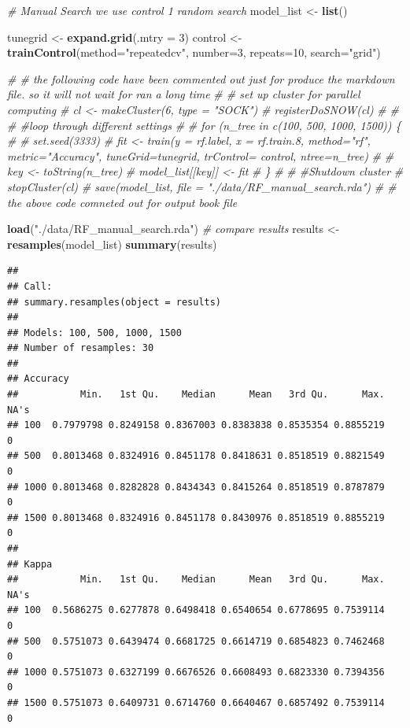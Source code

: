 \documentclass[
]{book}
\newenvironment{Shaded}{\begin{snugshade}}{\end{snugshade}}
\newcommand{\CommentTok}[1]{\textcolor[rgb]{0.56,0.35,0.01}{\textit{#1}}}
\newcommand{\DataTypeTok}[1]{\textcolor[rgb]{0.13,0.29,0.53}{#1}}
\newcommand{\DecValTok}[1]{\textcolor[rgb]{0.00,0.00,0.81}{#1}}
\newcommand{\KeywordTok}[1]{\textcolor[rgb]{0.13,0.29,0.53}{\textbf{#1}}}
\newcommand{\NormalTok}[1]{#1}
\newcommand{\StringTok}[1]{\textcolor[rgb]{0.31,0.60,0.02}{#1}}
\begin{document}
\begin{Shaded}
\begin{Highlighting}[]
\CommentTok{# Manual Search we use control 1 random search}
\NormalTok{model_list <-}\StringTok{ }\KeywordTok{list}\NormalTok{()}

\NormalTok{tunegrid <-}\StringTok{ }\KeywordTok{expand.grid}\NormalTok{(}\DataTypeTok{.mtry =} \DecValTok{3}\NormalTok{)}
\NormalTok{control <-}\StringTok{ }\KeywordTok{trainControl}\NormalTok{(}\DataTypeTok{method=}\StringTok{"repeatedcv"}\NormalTok{, }\DataTypeTok{number=}\DecValTok{3}\NormalTok{, }\DataTypeTok{repeats=}\DecValTok{10}\NormalTok{, }\DataTypeTok{search=}\StringTok{"grid"}\NormalTok{)}

\CommentTok{# # the following code have been commented out just for produce the markdown file. so it will not wait for ran a long time}
\CommentTok{# # set up cluster for parallel computing}
\CommentTok{# cl <- makeCluster(6, type = "SOCK")}
\CommentTok{# registerDoSNOW(cl)}
\CommentTok{# }
\CommentTok{# }
\CommentTok{# #loop through different settings}
\CommentTok{# }
\CommentTok{# for (n_tree in c(100, 500, 1000, 1500)) \{}
\CommentTok{#   }
\CommentTok{#   set.seed(3333)}
\CommentTok{#   fit <- train(y = rf.label, x = rf.train.8,  method="rf", metric="Accuracy",  tuneGrid=tunegrid, trControl= control, ntree=n_tree)}
\CommentTok{# }
\CommentTok{#   key <- toString(n_tree)}
\CommentTok{#   model_list[[key]] <- fit}
\CommentTok{# \}}
\CommentTok{# }
\CommentTok{# #Shutdown cluster}
\CommentTok{# stopCluster(cl)}
\CommentTok{# save(model_list, file = "./data/RF_manual_search.rda")}
\CommentTok{# # the above code comneted out for output book file}

\KeywordTok{load}\NormalTok{(}\StringTok{"./data/RF_manual_search.rda"}\NormalTok{)}
\CommentTok{# compare results}
\NormalTok{results <-}\StringTok{ }\KeywordTok{resamples}\NormalTok{(model_list)}
\KeywordTok{summary}\NormalTok{(results)}
\end{Highlighting}
\end{Shaded}

\begin{verbatim}
## 
## Call:
## summary.resamples(object = results)
## 
## Models: 100, 500, 1000, 1500 
## Number of resamples: 30 
## 
## Accuracy 
##           Min.   1st Qu.    Median      Mean   3rd Qu.      Max. NA's
## 100  0.7979798 0.8249158 0.8367003 0.8383838 0.8535354 0.8855219    0
## 500  0.8013468 0.8324916 0.8451178 0.8418631 0.8518519 0.8821549    0
## 1000 0.8013468 0.8282828 0.8434343 0.8415264 0.8518519 0.8787879    0
## 1500 0.8013468 0.8324916 0.8451178 0.8430976 0.8518519 0.8855219    0
## 
## Kappa 
##           Min.   1st Qu.    Median      Mean   3rd Qu.      Max. NA's
## 100  0.5686275 0.6277878 0.6498418 0.6540654 0.6778695 0.7539114    0
## 500  0.5751073 0.6439474 0.6681725 0.6614719 0.6854823 0.7462468    0
## 1000 0.5751073 0.6327199 0.6676526 0.6608493 0.6823330 0.7394356    0
## 1500 0.5751073 0.6409731 0.6714760 0.6640467 0.6857492 0.7539114    0
\end{verbatim}
\end{document}
